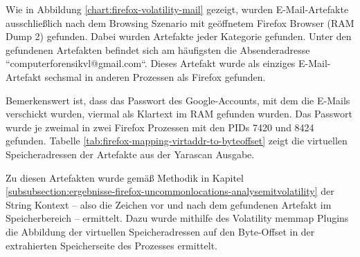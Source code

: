 Wie in Abbildung \ref{chart:firefox-volatility-mail} gezeigt, wurden E-Mail-Artefakte ausschließlich nach dem Browsing Szenario mit geöffnetem Firefox Browser (RAM Dump 2) gefunden. Dabei wurden Artefakte jeder Kategorie gefunden.
Unter den gefundenen Artefakten befindet sich am häufigsten die Absenderadresse ``computerforensikvl@gmail.com``. Dieses Artefakt wurde als einziges E-Mail-Artefakt sechsmal in anderen Prozessen als Firefox gefunden.

Bemerkenswert ist, dass das Passwort des Google-Accounts, mit dem die E-Mails verschickt wurden, viermal als Klartext im RAM gefunden wurden. Das Passwort wurde je zweimal in zwei Firefox Prozessen mit den PIDs 7420 und 8424 gefunden. Tabelle \ref{tab:firefox-mapping-virtaddr-to-byteoffset} zeigt die virtuellen Speicheradressen der Artefakte aus der Yarascan Ausgabe.
\begin{table}[h!]
\caption{Firefox: Abbildung der virtellen Speicheradressen der gefundenen Strings auf Byte-Offsets der entsprechenden Speicherseiten}
\label{tab:firefox-mapping-virtaddr-to-byteoffset}
\end{table}

Zu diesen Artefakten wurde gemäß Methodik in Kapitel \ref{subsubsection:ergebnisse-firefox-uncommonlocations-analysemitvolatility} der String Kontext -- also die Zeichen vor und nach dem gefundenen Artefakt im Speicherbereich -- ermittelt. Dazu wurde mithilfe des Volatility memmap Plugins die Abbildung der virtuellen Speicheradressen auf den Byte-Offset in der extrahierten Speicherseite des Prozesses ermittelt. 

